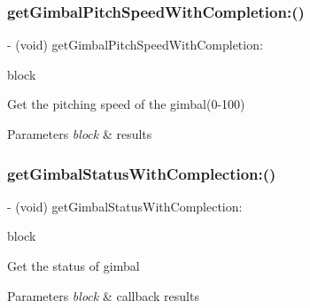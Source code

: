 \subsubsection{\texorpdfstring{get\+Gimbal\+Pitch\+Speed\+With\+Completion\+:()}{getGimbalPitchSpeedWithCompletion:()}}
{\footnotesize\ttfamily -\/ (void) get\+Gimbal\+Pitch\+Speed\+With\+Completion\+: \begin{DoxyParamCaption}\item[{(void($^\wedge$)(int speed, N\+S\+Error $\ast$\hyperlink{group___p_v_s_d_k___c_o_r_e___a_p_i___m_o_u_n_t_c_o_n_t_r_o_l_ga5a1de33b230662127568783314b4a54d}{\+\_\+\+Nullable} error))}]{block }\end{DoxyParamCaption}}

Get the pitching speed of the gimbal(0-\/100)


\begin{DoxyParams}{Parameters}
{\em block} & results \\
\hline
\end{DoxyParams}
\mbox{\label{interface_p_v_gimabal_ab62ca2f24df0aa61a97984663767eb9c}} 
\subsubsection{\texorpdfstring{get\+Gimbal\+Status\+With\+Complection\+:()}{getGimbalStatusWithComplection:()}}
{\footnotesize\ttfamily -\/ (void) get\+Gimbal\+Status\+With\+Complection\+: \begin{DoxyParamCaption}\item[{(void($^\wedge$)(P\+V\+Gimbal\+Status gimbal\+Status, N\+S\+Error $\ast$\hyperlink{group___p_v_s_d_k___c_o_r_e___a_p_i___m_o_u_n_t_c_o_n_t_r_o_l_ga5a1de33b230662127568783314b4a54d}{\+\_\+\+Nullable} error))}]{block }\end{DoxyParamCaption}}

Get the status of gimbal


\begin{DoxyParams}{Parameters}
{\em block} & callback results \\
\hline
\end{DoxyParams}
\mbox{\label{interface_p_v_gimabal_a8937f926f4f8b06a20937ae541b55e27}} 
